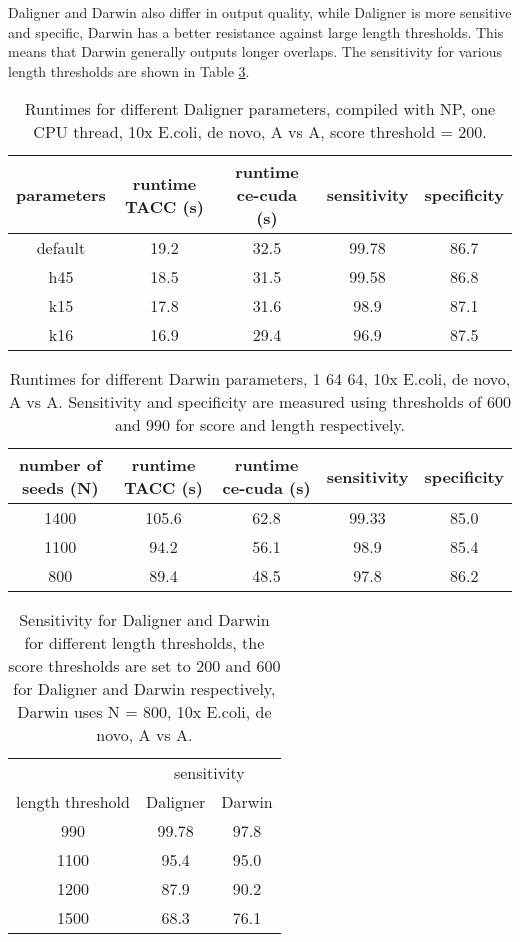 \documentclass[../thesis.tex]{subfiles}
\begin{document}
Daligner and Darwin also differ in output quality, while Daligner is more sensitive and specific, Darwin has a better resistance against large length thresholds.
This means that Darwin generally outputs longer overlaps.
The sensitivity for various length thresholds are shown in Table \ref{tbl:length_thresholds}.

\begin{table}
\centering
\caption{Runtimes for different Daligner parameters, compiled with NP, one CPU thread, 10x E.coli, de novo, A vs A, score threshold = 200.}
\label{tbl:daligner5}
\begin{tabular}{c|c c c c}
parameters & runtime TACC (s) & runtime ce-cuda (s) & sensitivity & specificity \\ \hline
default & 19.2 & 32.5 & 99.78 & 86.7 \\
h45     & 18.5 & 31.5 & 99.58 & 86.8 \\
k15     & 17.8 & 31.6 & 98.9 & 87.1 \\
k16     & 16.9 & 29.4 & 96.9 & 87.5 \\
\end{tabular}
\end{table}

\begin{table}
\centering
\caption{Runtimes for different Darwin parameters, 1 64 64, 10x E.coli, de novo, A vs A. Sensitivity and specificity are measured using thresholds of 600 and 990 for score and length respectively.}
\label{tbl:darwin4}
\begin{tabular}{c|c c c c}
number of seeds (N) & runtime TACC (s) & runtime ce-cuda (s) & sensitivity & specificity \\ \hline
1400 & 105.6 & 62.8 & 99.33 & 85.0 \\
1100 & 94.2 & 56.1 & 98.9 & 85.4 \\
800 & 89.4 & 48.5 & 97.8 & 86.2 \\
\end{tabular}
\end{table}

\begin{table}
\centering
\caption{Sensitivity for Daligner and Darwin for different length thresholds, the score thresholds are set to 200 and 600 for Daligner and Darwin respectively, Darwin uses N = 800, 10x E.coli, de novo, A vs A.}
\label{tbl:length_thresholds}
\begin{tabular}{c|c c}
 & \multicolumn{2}{c}{sensitivity} \\
length threshold & Daligner & Darwin \\ \hline
990 & 99.78 & 97.8 \\
1100 & 95.4 & 95.0 \\
1200 & 87.9 & 90.2 \\
1500 & 68.3 & 76.1 \\
\end{tabular}
\end{table}
\end{document}
